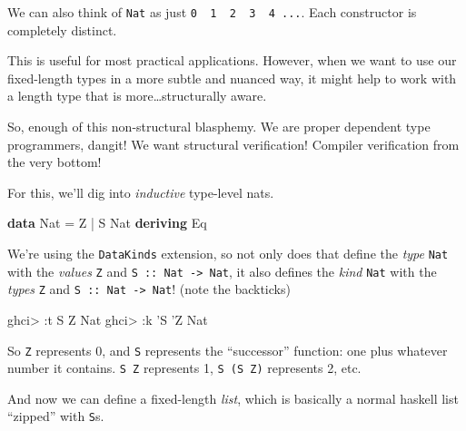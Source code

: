 \documentclass[]{article}
\newenvironment{Shaded}{}{}
\newcommand{\KeywordTok}[1]{\textcolor[rgb]{0.00,0.44,0.13}{\textbf{#1}}}
\newcommand{\DataTypeTok}[1]{\textcolor[rgb]{0.56,0.13,0.00}{#1}}
\newcommand{\CharTok}[1]{\textcolor[rgb]{0.25,0.44,0.63}{#1}}
\newcommand{\FunctionTok}[1]{\textcolor[rgb]{0.02,0.16,0.49}{#1}}
\newcommand{\NormalTok}[1]{#1}
\begin{document}
We can also think of \texttt{Nat} as just
\texttt{0\ \textbar{}\ 1\ \textbar{}\ 2\ \textbar{}\ 3\ \textbar{}\ 4\ ...}.
Each constructor is completely distinct.

This is useful for most practical applications. However, when we want to use our
fixed-length types in a more subtle and nuanced way, it might help to work with
a length type that is more\ldots{}structurally aware.

So, enough of this non-structural blasphemy. We are proper dependent type
programmers, dangit! We want structural verification! Compiler verification from
the very bottom!

For this, we'll dig into \emph{inductive} type-level nats.

\begin{Shaded}
\begin{Highlighting}[]
\KeywordTok{data} \DataTypeTok{Nat} \FunctionTok{=} \DataTypeTok{Z} \FunctionTok{|} \DataTypeTok{S} \DataTypeTok{Nat}
  \KeywordTok{deriving} \DataTypeTok{Eq}
\end{Highlighting}
\end{Shaded}

We're using the \texttt{DataKinds} extension, so not only does that define the
\emph{type} \texttt{Nat} with the \emph{values} \texttt{Z} and
\texttt{S\ ::\ Nat\ -\textgreater{}\ Nat}, it also defines the \emph{kind}
\texttt{Nat} with the \emph{types} \texttt{\textquotesingle{}Z} and
\texttt{\textquotesingle{}S\ ::\ Nat\ -\textgreater{}\ Nat}! (note the
backticks)

\begin{Shaded}
\begin{Highlighting}[]
\NormalTok{ghci}\FunctionTok{>} \FunctionTok{:}\NormalTok{t }\DataTypeTok{S} \DataTypeTok{Z}
\DataTypeTok{Nat}
\NormalTok{ghci}\FunctionTok{>} \FunctionTok{:}\NormalTok{k }\CharTok{'S '}\DataTypeTok{Z}
\DataTypeTok{Nat}
\end{Highlighting}
\end{Shaded}

So \texttt{\textquotesingle{}Z} represents 0, and \texttt{\textquotesingle{}S}
represents the ``successor'' function: one plus whatever number it contains.
\texttt{\textquotesingle{}S\ \textquotesingle{}Z} represents 1,
\texttt{\textquotesingle{}S\ (\textquotesingle{}S\ \textquotesingle{}Z)}
represents 2, etc.

And now we can define a fixed-length \emph{list}, which is basically a normal
haskell list ``zipped'' with \texttt{S}s.
\end{document}
